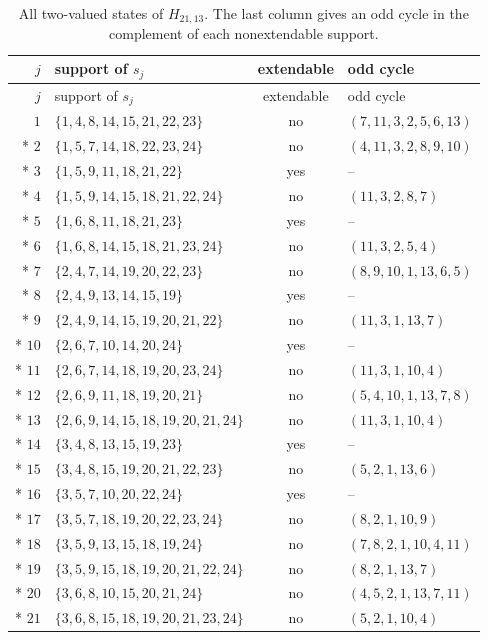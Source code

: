 \documentclass[aps,pra,reprint,superscriptaddress,longbibliography,nofootinbib,floatfix,10pt]{revtex4-2}
\theoremstyle{definition}
\begin{document}
\begingroup\small\setlength{\LTpre}{6pt}\setlength{\LTpost}{8pt}
\begin{longtable}{rlcl}
\caption{All two-valued states of $H_{21,13}$. The last column gives an odd cycle in the complement of each nonextendable support.}\label{tab:h21-states}\\
\toprule $j$ & support of $s_j$ & extendable & odd cycle\\\midrule
\endfirsthead
\toprule $j$ & support of $s_j$ & extendable & odd cycle\\\midrule
\endhead
\bottomrule\endfoot
$1$ & $\{1,4,8,14,15,21,22,23\}$ & no & $(7,11,3,2,5,6,13)$ \\*
$2$ & $\{1,5,7,14,18,22,23,24\}$ & no & $(4,11,3,2,8,9,10)$ \\*
$3$ & $\{1,5,9,11,18,21,22\}$ & yes & -- \\*
$4$ & $\{1,5,9,14,15,18,21,22,24\}$ & no & $(11,3,2,8,7)$ \\*
$5$ & $\{1,6,8,11,18,21,23\}$ & yes & -- \\*
$6$ & $\{1,6,8,14,15,18,21,23,24\}$ & no & $(11,3,2,5,4)$ \\*
$7$ & $\{2,4,7,14,19,20,22,23\}$ & no & $(8,9,10,1,13,6,5)$ \\*
$8$ & $\{2,4,9,13,14,15,19\}$ & yes & -- \\*
$9$ & $\{2,4,9,14,15,19,20,21,22\}$ & no & $(11,3,1,13,7)$ \\*
$10$ & $\{2,6,7,10,14,20,24\}$ & yes & -- \\*
$11$ & $\{2,6,7,14,18,19,20,23,24\}$ & no & $(11,3,1,10,4)$ \\*
$12$ & $\{2,6,9,11,18,19,20,21\}$ & no & $(5,4,10,1,13,7,8)$ \\*
$13$ & $\{2,6,9,14,15,18,19,20,21,24\}$ & no & $(11,3,1,10,4)$ \\*
$14$ & $\{3,4,8,13,15,19,23\}$ & yes & -- \\*
$15$ & $\{3,4,8,15,19,20,21,22,23\}$ & no & $(5,2,1,13,6)$ \\*
$16$ & $\{3,5,7,10,20,22,24\}$ & yes & -- \\*
$17$ & $\{3,5,7,18,19,20,22,23,24\}$ & no & $(8,2,1,10,9)$ \\*
$18$ & $\{3,5,9,13,15,18,19,24\}$ & no & $(7,8,2,1,10,4,11)$ \\*
$19$ & $\{3,5,9,15,18,19,20,21,22,24\}$ & no & $(8,2,1,13,7)$ \\*
$20$ & $\{3,6,8,10,15,20,21,24\}$ & no & $(4,5,2,1,13,7,11)$ \\*
$21$ & $\{3,6,8,15,18,19,20,21,23,24\}$ & no & $(5,2,1,10,4)$ \\
\end{longtable}\endgroup
\end{document}
